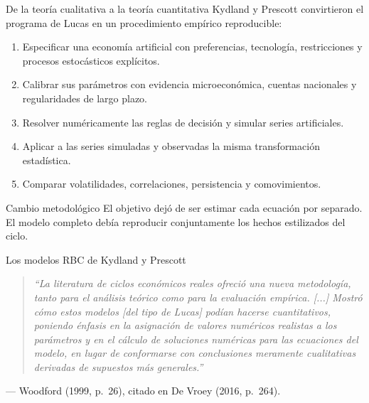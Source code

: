 \documentclass[aspectratio=169,11pt]{beamer}
\newcommand{\notafuentes}[1]{\note{[Sources] #1}}
\begin{document}
\begin{frame}{De la teoría cualitativa a la teoría cuantitativa}
  \footnotesize
  Kydland y Prescott convirtieron el programa de Lucas en un procedimiento
  empírico reproducible:

  \begin{enumerate}
    \setlength{\itemsep}{0.36em}
    \item Especificar una economía artificial con preferencias, tecnología,
    restricciones y procesos estocásticos explícitos.

    \item Calibrar sus parámetros con evidencia microeconómica, cuentas nacionales y regularidades de largo plazo.

    \item Resolver numéricamente las reglas de decisión y simular series artificiales.

    \item Aplicar a las series simuladas y observadas la misma transformación estadística.

    \item Comparar volatilidades, correlaciones, persistencia y comovimientos.
  \end{enumerate}

  \begin{block}{Cambio metodológico}
    El objetivo dejó de ser estimar cada ecuación por separado. El modelo
    completo debía reproducir conjuntamente los hechos estilizados del ciclo.
  \end{block}
  \notafuentes{De Vroey (2016), capítulo 15.}
\end{frame}


\begin{frame}{Los modelos RBC de Kydland y Prescott}
  \small

  \begin{quote}
    \itshape
    ``La literatura de ciclos económicos reales ofreció una nueva metodología, tanto para el análisis teórico como para la evaluación empírica. [...] Mostró cómo estos modelos [del tipo de Lucas] podían hacerse cuantitativos, poniendo énfasis en la asignación de valores numéricos realistas a los parámetros y en el cálculo de soluciones numéricas para las ecuaciones del modelo, en lugar de conformarse con conclusiones meramente cualitativas derivadas de supuestos más generales.''
  \end{quote}

  \vspace{0.4cm}

  \begin{flushright}
    \normalfont
    --- Woodford (1999, p.~26), citado en De Vroey (2016, p.~264).
  \end{flushright}
\end{frame}
\end{document}
